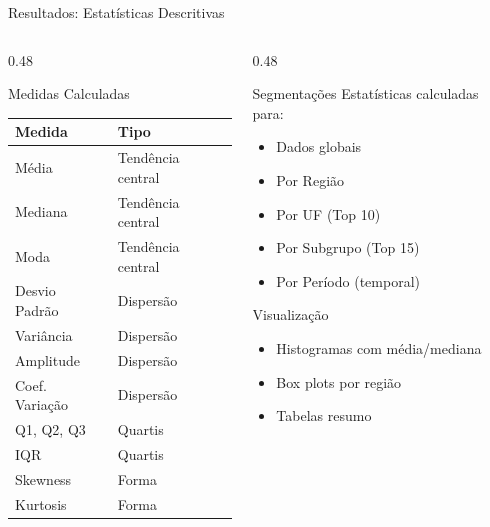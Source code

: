 \documentclass[aspectratio=169,10pt]{beamer}
\begin{document}
\begin{frame}{Resultados: Estatísticas Descritivas}

\begin{columns}[T]
\begin{column}{0.48\textwidth}
    \begin{block}{Medidas Calculadas}
    \begin{tabular}{ll}
    \toprule
    \textbf{Medida} & \textbf{Tipo} \\
    \midrule
    Média & Tendência central \\
    Mediana & Tendência central \\
    Moda & Tendência central \\
    Desvio Padrão & Dispersão \\
    Variância & Dispersão \\
    Amplitude & Dispersão \\
    Coef. Variação & Dispersão \\
    Q1, Q2, Q3 & Quartis \\
    IQR & Quartis \\
    Skewness & Forma \\
    Kurtosis & Forma \\
    \bottomrule
    \end{tabular}
    \end{block}
\end{column}
\begin{column}{0.48\textwidth}
    \begin{block}{Segmentações}
    Estatísticas calculadas para:
    \begin{itemize}
        \item Dados globais
        \item Por Região
        \item Por UF (Top 10)
        \item Por Subgrupo (Top 15)
        \item Por Período (temporal)
    \end{itemize}
    \end{block}

    \begin{alertblock}{Visualização}
    \begin{itemize}
        \item Histogramas com média/mediana
        \item Box plots por região
        \item Tabelas resumo
    \end{itemize}
    \end{alertblock}
\end{column}
\end{columns}

\end{frame}
\end{document}
